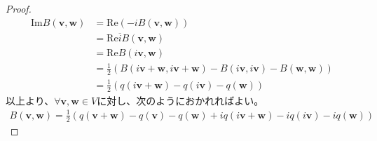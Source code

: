 \documentclass[dvipdfmx]{jsarticle}
\begin{document}
\begin{proof}
\begin{align*}
{\mathrm{Im}}{B\left( \mathbf{v},\mathbf{w} \right)} &= {\mathrm{Re}}\left( - iB\left( \mathbf{v},\mathbf{w} \right) \right)\\
&= {\mathrm{Re}}{\overline{i}B\left( \mathbf{v},\mathbf{w} \right)}\\
&= {\mathrm{Re}}{B\left( i\mathbf{v},\mathbf{w} \right)}\\
&= \frac{1}{2}\left( B\left( i\mathbf{v} + \mathbf{w},i\mathbf{v} + \mathbf{w} \right) - B\left( i\mathbf{v},i\mathbf{v} \right) - B\left( \mathbf{w},\mathbf{w} \right) \right)\\
&= \frac{1}{2}\left( q\left( i\mathbf{v} + \mathbf{w} \right) - q\left( i\mathbf{v} \right) - q\left( \mathbf{w} \right) \right)
\end{align*}
以上より、$\forall\mathbf{v},\mathbf{w} \in V$に対し、次のようにおかれればよい。
\begin{align*}
B\left( \mathbf{v},\mathbf{w} \right) = \frac{1}{2}\left( q\left( \mathbf{v} + \mathbf{w} \right) - q\left( \mathbf{v} \right) - q\left( \mathbf{w} \right) + iq\left( i\mathbf{v} + \mathbf{w} \right) - iq\left( i\mathbf{v} \right) - iq\left( \mathbf{w} \right) \right)
\end{align*}
\end{proof}
\end{document}
